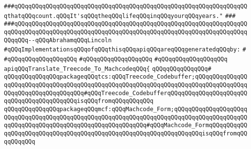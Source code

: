 \verb|###qQQqqQQqqQQqqQQqqQQqqQQqqQQqqQQqqQQqqQQqqQQqqQQqqQQqqQQqqQQqqQQqqQQqthatqQQqcount.qQQqIt'sqQQqtheqQQqlifeqQQqinqQQqyourqQQqyears."|\newline
\verb|###|\newline
\verb|###qQQqqQQqqQQqqQQqqQQqqQQqqQQqqQQqqQQqqQQqqQQqqQQqqQQqqQQqqQQqqQQqqQQqqQQqqQQqqQQqqQQqqQQqqQQqqQQqqQQqqQQqqQQqqQQqqQQqqQQqqQQqqQQqqQQqqQQqqQQqqQQq--qQQqAbrahamqQQqLincoln|\newline
\newline
\newline
\verb|#qQQqImplementationsqQQqofqQQqthisqQQqapiqQQqareqQQqgeneratedqQQqby:|\newline
\verb|#|\newline
\verb|#qQQqqQQqqQQqqQQqqQQq|\newline
\verb|#qQQqqQQqqQQqqQQqqQQq|\newline
\verb|#qQQqqQQqqQQqqQQqqQQq|\newline
\newline
\verb|apiqQQqTranslate_Treecode_To_MachcodeqQQq{|\newline
\verb|qQQqqQQqqQQqqQQq#|\newline
\verb|qQQqqQQqqQQqqQQqpackageqQQqtcs:qQQqTreecode_Codebuffer;qQQqqQQqqQQqqQQqqQQqqQQqqQQqqQQqqQQqqQQqqQQqqQQqqQQqqQQqqQQqqQQqqQQqqQQqqQQqqQQqqQQqqQQqqQQqqQQqqQQqqQQqqQQq#qQQqTreecode_CodebufferqQQqqQQqqQQqqQQqqQQqqQQqqQQqqQQqqQQqqQQqqQQqisqQQqfromqQQqqQQqqQQq|\newline
\verb|qQQqqQQqqQQqqQQqpackageqQQqmcf:qQQqMachcode_Form;qQQqqQQqqQQqqQQqqQQqqQQqqQQqqQQqqQQqqQQqqQQqqQQqqQQqqQQqqQQqqQQqqQQqqQQqqQQqqQQqqQQqqQQqqQQqqQQqqQQqqQQqqQQqqQQqqQQqqQQqqQQqqQQqqQQq#qQQqMachcode_FormqQQqqQQqqQQqqQQqqQQqqQQqqQQqqQQqqQQqqQQqqQQqqQQqqQQqqQQqqQQqqQQqqQQqisqQQqfromqQQqqQQqqQQq|\newline
